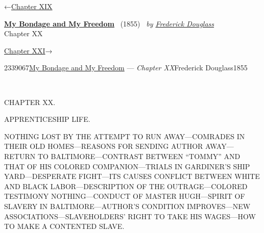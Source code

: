 \hypertarget{headerContainer}{}
\hypertarget{navigationHeader}{}
\protect\hypertarget{headerprevious}{}{←\href{/wiki/My_Bondage_and_My_Freedom_(1855)/Chapter_XIX}{Chapter
XIX}}

\textbf{\protect\hypertarget{header_title_text}{}{\href{/wiki/My_Bondage_and_My_Freedom_(1855)}{My
Bondage and My Freedom}}} ~(1855)~ \emph{by
\href{/wiki/Author:Frederick_Douglass}{\protect\hypertarget{header_author_text}{}{{Frederick
Douglass}}}}\\
\protect\hypertarget{header_section_text}{}{Chapter XX}

\protect\hypertarget{headernext}{}{\href{/wiki/My_Bondage_and_My_Freedom_(1855)/Chapter_XXI}{Chapter
XXI}→}

\hypertarget{navigationNotes}{}

\hypertarget{ws-data}{}
\protect\hypertarget{ws-article-id}{}{2339067}\protect\hypertarget{ws-title}{}{\href{/wiki/My_Bondage_and_My_Freedom_(1855)}{My
Bondage and My Freedom} --- \emph{Chapter
XX}}\protect\hypertarget{ws-author}{}{Frederick
Douglass}\protect\hypertarget{ws-year}{}{1855}

{\protect\hypertarget{304}{}{}}

~

{CHAPTER XX.}

APPRENTICESHIP LIFE.

{NOTHING LOST BY THE ATTEMPT TO RUN AWAY---COMRADES IN THEIR OLD
HOMES---REASONS FOR SENDING AUTHOR AWAY---RETURN TO BALTIMORE---CONTRAST
BETWEEN ``TOMMY'' AND THAT OF HIS COLORED COMPANION---TRIALS IN
GARDINER'S SHIP YARD---DESPERATE FIGHT---ITS CAUSES CONFLICT BETWEEN
WHITE AND BLACK LABOR---DESCRIPTION OF THE OUTRAGE---COLORED TESTIMONY
NOTHING---CONDUCT OF MASTER HUGH---SPIRIT OF SLAVERY IN
BALTIMORE---AUTHOR'S CONDITION IMPROVES---NEW
ASSOCIATIONS---SLAVEHOLDERS' RIGHT TO TAKE HIS WAGES---HOW TO MAKE A
CONTENTED SLAVE.}

